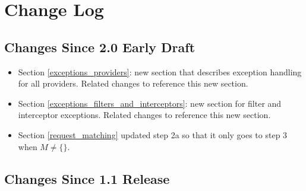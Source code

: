\chapter{Change Log}

\section{Changes Since 2.0 Early Draft}

\begin{itemize}
\item Section \ref{exceptions_providers}: new section that describes exception handling for all providers. Related changes to reference this new section.
\item Section \ref{exceptions_filters_and_interceptors}: new section for filter and interceptor exceptions. Related changes to reference this new section.
\item Section \ref{request_matching} updated step 2a so that it only goes to step 3 when $M \neq \{\}$. 
\end{itemize}

\section{Changes Since 1.1 Release}

